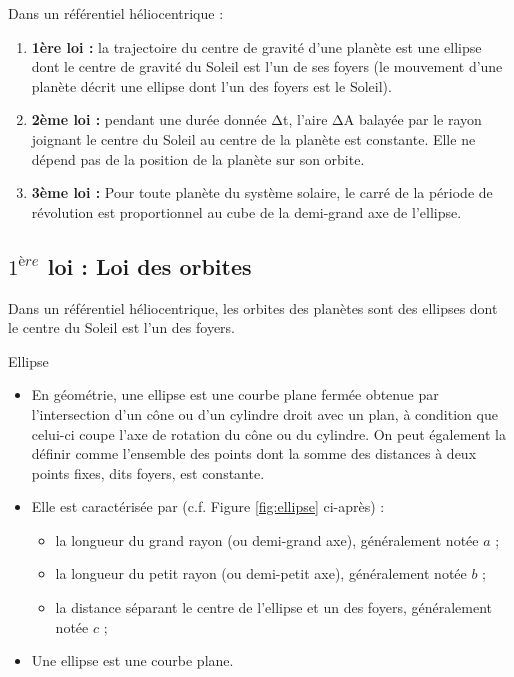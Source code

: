 \documentclass[11pt,a4paper]{article}
\begin{document}
\endgroup
Dans un référentiel héliocentrique :
\begin{enumerate}
    \item \textbf{1ère loi : }la trajectoire du centre de gravité d’une planète est une ellipse dont le centre de gravité du Soleil est l’un de ses foyers (le mouvement d’une planète décrit une ellipse dont l’un des foyers est le Soleil).
    \item \textbf{2ème loi : }pendant une durée donnée Δt, l’aire ΔA balayée par le rayon joignant le centre du Soleil au centre de la planète est constante. Elle ne dépend pas de la position de la planète sur son orbite. 
    \item \textbf{3ème loi : }Pour toute planète du système solaire, le carré de la période de révolution est proportionnel au cube de la demi-grand axe de l’ellipse. 
\end{enumerate}

\subsection{$1^{ère}$ loi : Loi des orbites}

\begin{shaded}
Dans un référentiel héliocentrique, les orbites des planètes sont des ellipses dont le centre du Soleil est l’un des foyers. 
\end{shaded}

\begin{defn}{Ellipse}
\begin{itemize}
    \item En géométrie, une ellipse est une courbe plane fermée obtenue par l’intersection d’un cône ou d'un cylindre droit avec un plan, à condition que celui-ci coupe l'axe de rotation du cône ou du cylindre. On peut également la définir comme l’ensemble des points dont la somme des distances à deux points fixes, dits foyers, est constante. 
    \item Elle est caractérisée par (c.f. Figure \ref{fig:ellipse} ci-après) :
    \begin{itemize}
        \item la longueur du grand rayon (ou demi-grand axe), généralement notée $a$ ;
        \item la longueur du petit rayon (ou demi-petit axe), généralement notée $b$ ;
        \item la distance séparant le centre de l'ellipse et un des foyers, généralement notée $c$ ;
    \end{itemize}
    \item Une ellipse est une courbe plane.  
\end{itemize}
\end{defn}
\end{document}
